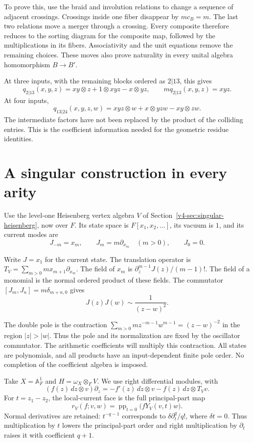 To prove this, use the braid and involution relations to change a sequence
of adjacent crossings. Crossings inside one fiber disappear by $mc_B=m$. The last two
relations move a merger through a crossing. Every composite therefore
reduces to the sorting diagram for the composite map, followed by the
multiplications in its fibers. Associativity and the unit equations remove
the remaining choices. These moves also prove naturality in every unital
algebra homomorphism $B\to B'$.

At three inputs, with the remaining blocks ordered as $2|13$, this gives
\begin{equation}\label{v4-arith:asi:q13}
 q_{2|13}(x,y,z)=xy\otimes z+1\otimes xyz-x\otimes yz,
 \qquad m q_{2|13}(x,y,z)=xyz.
\end{equation}
At four inputs,
\[
 q_{13|24}(x,y,z,w)=xyz\otimes w+x\otimes yzw-xy\otimes zw.
\]
The intermediate factors have not been replaced by the product of the
colliding entries. This is the coefficient information needed for the
geometric residue identities.

\section{A singular construction in every arity}

Use the level-one Heisenberg vertex algebra \(V\)
of Section~\ref{v4-sec:singular-heisenberg}, now over \(F\). Its state space is
$F[x_1,x_2,\ldots]$, its vacuum is $1$, and its current modes are
\[
 J_{-m}=x_m,\qquad J_m=m\partial_{x_m}\quad(m>0),\qquad J_0=0.
\]

Write $J=x_1$ for the current state. The translation operator is
$T_V=\sum_{m>0}m x_{m+1}\partial_{x_m}$.
The field of $x_m$ is $\partial_z^{m-1}J(z)/(m-1)!$. The field of a
monomial is the normal ordered product of these fields. The commutator
$[J_m,J_n]=m\delta_{m+n,0}$ gives
\begin{equation}\label{v4-arith:asi:Heisenberg-pole}
 J(z)J(w)\sim\frac1{(z-w)^2}.
\end{equation}

The double pole is the contraction
$\sum_{m>0}m z^{-m-1}w^{m-1}=(z-w)^{-2}$ in the region $|z|>|w|$.
Thus the pole and its normalization are fixed by the oscillator
commutator. The arithmetic coefficients will multiply this contraction.
All states are polynomials, and all products have an input-dependent finite
pole order. No completion of the coefficient algebra is imposed.

Take $X=\mathbb A^1_F$ and $H=\omega_X\otimes_F V$. We use right
differential modules, with
\[
 (f(z)\,dz\otimes v)\partial_z
 =-f'(z)\,dz\otimes v-f(z)\,dz\otimes T_Vv.
\]
For $t=z_1-z_2$, the local-current face is the full principal-part map
\[
 r_V(f;v,w)=\operatorname{pp}_{t=0}\bigl(fY_V(v,t)w\bigr).
\]
Normal derivatives are retained: $t^{-q-1}$ corresponds to
$\delta\partial_t^q/q!$, where $\delta t=0$. Thus multiplication by $t$
lowers the principal-part order and right multiplication by $\partial_t$
raises it with coefficient $q+1$.


